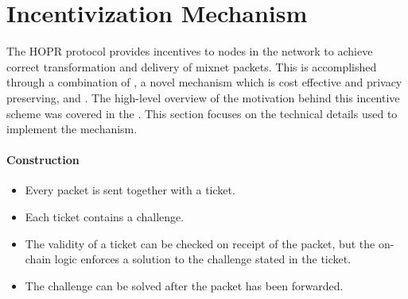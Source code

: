 \section{Incentivization Mechanism}
\label{sec:incentives}






The HOPR protocol provides incentives to nodes in the network to achieve correct transformation and delivery of mixnet packets. This is accomplished through a combination of , a novel mechanism which is cost effective and privacy preserving, and . The high-level overview of the motivation behind this incentive scheme was covered in the . This section focuses on the technical details used to implement the mechanism.

\paragraph{Construction}

\begin{itemize}
    \item Every packet is sent together with a ticket.
    \item Each ticket contains a challenge.
    \item The validity of a ticket can be checked on receipt of the packet, but the on-chain logic enforces a solution to the challenge stated in the ticket.
    \item The challenge can be solved after the packet has been forwarded.
\end{itemize}






